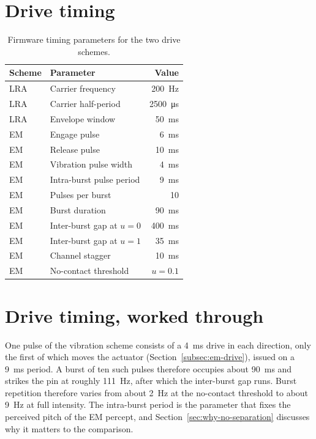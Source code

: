 \documentclass[12pt, a4paper, twoside, openright]{report}
\begin{document}
\section*{Drive timing}

\begin{table}[ht]
    \centering
    \small
    \caption{Firmware timing parameters for the two drive schemes.}
    \label{tab:appC-timing}
    \begin{tabular}{@{}llr@{}}
        \toprule
        Scheme & Parameter                & Value                    \\
        \midrule
        LRA    & Carrier frequency        & \SI{200}{\hertz}         \\
        LRA    & Carrier half-period      & \SI{2500}{\micro\second} \\
        LRA    & Envelope window          & \SI{50}{\milli\second}   \\
        \midrule
        EM     & Engage pulse             & \SI{6}{\milli\second}    \\
        EM     & Release pulse            & \SI{10}{\milli\second}   \\
        EM     & Vibration pulse width    & \SI{4}{\milli\second}    \\
        EM     & Intra-burst pulse period & \SI{9}{\milli\second}    \\
        EM     & Pulses per burst         & 10                       \\
        EM     & Burst duration           & \SI{90}{\milli\second}   \\
        EM     & Inter-burst gap at $u=0$ & \SI{400}{\milli\second}  \\
        EM     & Inter-burst gap at $u=1$ & \SI{35}{\milli\second}   \\
        EM     & Channel stagger          & \SI{10}{\milli\second}   \\
        EM     & No-contact threshold     & $u = 0.1$                \\
        \bottomrule
    \end{tabular}
\end{table}

\section*{Drive timing, worked through}

One pulse of the vibration scheme consists of a \SI{4}{\milli\second} drive
in each direction, only the first of which moves the actuator
(Section~\ref{subsec:em-drive}), issued on a \SI{9}{\milli\second} period. A
burst of ten such pulses therefore occupies about \SI{90}{\milli\second} and
strikes the pin at roughly \SI{111}{\hertz}, after which the inter-burst gap
runs. Burst repetition therefore varies from about \SI{2}{\hertz} at the
no-contact threshold to about \SI{9}{\hertz} at full intensity. The intra-burst
period is the parameter that fixes the perceived pitch of the EM percept, and
Section~\ref{sec:why-no-separation} discusses why it matters to the comparison.
\end{document}
